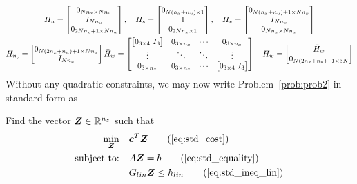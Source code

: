 \documentclass[12pt]{article}
\begin{document}
\begin{gather*}
H_u = \begin{bmatrix}
0_{N n_x \times N n_u} \\ I_{N n_u} \\ 0_{2 N n_x + 1 \times N n_u}
\end{bmatrix}, \quad H_s = \begin{bmatrix}
0_{N(n_x+n_u) \times 1} \\ 1 \\ 0_{2N n_x \times 1}
\end{bmatrix}, \quad H_v = \begin{bmatrix}
0_{N (n_x+n_u) + 1 \times N n_x} \\ I_{N n_x} \\ 0_{N n_x \times N n_x} 
\end{bmatrix}  \\
H_{\eta_v} = \begin{bmatrix}
0_{N(2n_x+n_u)+1 \times N n_x} \\ I_{N n_x}
\end{bmatrix}
\bar{H}_w = \begin{bmatrix}
\big[ 0_{3 \times 4} \ I_{3} \big] & 0_{3 \times n_x} & \cdots & 0_{3 \times n_x} \\
\vdots & \ddots & \ddots & \vdots \\
0_{3 \times n_x} & 0_{3 \times n_x} & \cdots & \big[ 0_{3 \times 4} \ I_{3} \big]
\end{bmatrix} \quad H_w = \begin{bmatrix}
\bar{H}_w \\ 0_{N (2n_x+n_u)+1 \times 3N} 
\end{bmatrix}
\end{gather*}
Without any quadratic constraints, we may now write Problem~\ref{prob:prob2} in standard form as
\begin{problem}
Find the vector $\bm{Z}\in{\mathbb{R}}^{n_z}$ such that
\begin{subequations}\label{eq:prob2}
\begin{align}
\min_{\bm{Z}} &\quad \bm{c}^T \bm{Z} \tag{\ref{eq:std_cost}}\\
\text{subject to:} &\quad A \bm{Z} = b \tag{\ref{eq:std_equality}} \\
&\quad G_{lin} \bm{Z} \leq h_{lin} \tag{\ref{eq:std_ineq_lin}}
\end{align}
\end{subequations}
\end{problem}
\end{document}
